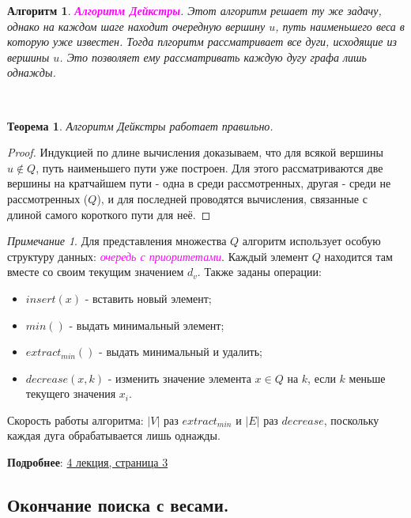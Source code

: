 \documentclass[a4paper]{article}
\theoremstyle{indented}
\newtheorem{theorem}{Теорема}
\newtheorem{alg}{Алгоритм}
\theoremstyle{definition}
\theoremstyle{remark}
\newtheorem{remark}{Примечание}
\begin{document}
\begin{alg}
    \textcolor{magenta}{\hypertarget{t15}{\textbf{Алгоритм Дейкстры}}}. Этот алгоритм решает ту же задачу, однако на каждом шаге находит очередную вершину $u$, путь наименьшего веса в которую уже известен. Тогда плгоритм рассматривает все дуги, исходящие из вершины $u$. Это позволяет ему рассматривать каждую дугу графа лишь однажды.
\end{alg} \

\begin{theorem}
    Алгоритм Дейкстры работает правильно.
\end{theorem}

\begin{proof}
    Индукцией по длине вычисления доказываем, что для всякой вершины $u\notin Q$, путь наименьшего пути уже построен. Для этого рассматриваются две вершины на кратчайшем пути - одна в среди рассмотренных, другая - среди не рассмотренных ($Q$), и для последней проводятся вычисления, связанные с длиной самого короткого пути для неё.
\end{proof}

\begin{remark}
    Для представления множества $Q$ алгоритм использует особую структуру данных: \textcolor{magenta}{\hypertarget{d3}{\textit{очередь с приоритетами}}}. Каждый элемент $Q$ находится там вместе со своим текущим значением $d_v$. Также заданы операции: 

    \begin{itemize}
        \item $insert(x)$ - вставить новый элемент; 
        \item $min()$ - выдать минимальный элемент; 
        \item $extract_{min}()$ - выдать минимальный и удалить; 
        \item $decrease(x, k)$ - изменить значение элемента $x\in Q$ на $k$, если $k$ меньше текущего значения $x_i$. 
    \end{itemize}

    Скорость работы алгоритма: $|V|$ раз $extract_{min}$ и $|E|$ раз $decrease$, поскольку каждая дуга обрабатывается лишь однажды. 
\end{remark}

\textbf{Подробнее}: \href{https://users.math-cs.spbu.ru/~okhotin/teaching/algorithms_2020/okhotin_algorithms_2020_l4.pdf}{4 лекция, страница 3}

\subsection{Окончание поиска с весами.}
\end{document}
